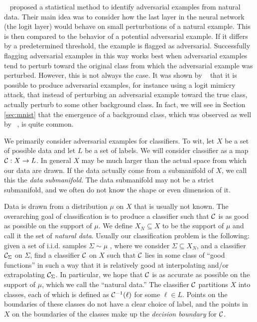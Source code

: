 ~\cite{roth19aodds} proposed a statistical method to identify adversarial examples from natural data. Their main idea was to consider how the last layer in the neural network (the logit layer) would behave on small perturbations of a natural example. %
This is then compared to the behavior of a potential adversarial example. If it differs by a predetermined threshold, the example is flagged as adversarial. Successfully flagging adversarial examples in this way works best when adversarial examples tend to perturb toward the original class from which the adversarial example was perturbed. However, this is not always the case.
It was shown by ~\cite{hosseini2019odds} that it is possible to produce adversarial examples, for instance using a logit mimicry attack, that instead of perturbing an adversarial example toward the true class, actually perturb to some other background class. In fact, we will see in Section \ref{sec:mnist} that the emergence of a background class, which was observed as well by ~\cite{roth19aodds}, is quite common. 

We primarily consider adversarial examples for classifiers.  To wit, let $X$ be a set of possible data and let $L$ be a set of labels. We will consider classifier as a map $\mathcal{C}: X \to L$. In general $X$ may be much larger than the actual space from which our data are drawn. If the data actually come from a submanifold of $X$, we call this the \emph{data submanifold}. The data submanifold may not be a strict submanifold, and we often do not know the shape or even dimension of it.

Data is drawn from a distribution $\mu$ on $X$ that is usually not known. The overarching goal of classification is to produce a classifier such that $\mathcal{C}$ is as good as possible on the support of $\mu$. 
We define $X_N \subseteq X$ to be the support of $\mu$ and call it the set of \emph{natural data}. 
Usually our classification problem is the following: given a set of i.i.d. samples $\Sigma \sim \mu$
, where we consider $\Sigma \subseteq X_N$, 
and a classifier $\mathcal{C}_\Sigma$ on $\Sigma$, find a classifier $\mathcal{C}$ on $X$ such that $\mathcal{C}$ lies in some class of ``good functions'' in such a way that it is relatively good at interpolating and/or extrapolating $\mathcal{C}_\Sigma$. In particular, we hope that $\mathcal{C}$ is as accurate as possible on the support of $\mu$, which we call the ``natural data.'' %
The classifier $\mathcal{C}$ partitions $X$ into classes, each of which is defined as $\mathcal{C}^{-1}(\ell)$ for some $\ell \in L$. Points on the boundaries of these classes do not have a clear choice of label, and the points in $X$ on the boundaries of the classes make up the \emph{decision boundary} for $\mathcal{C}$.

